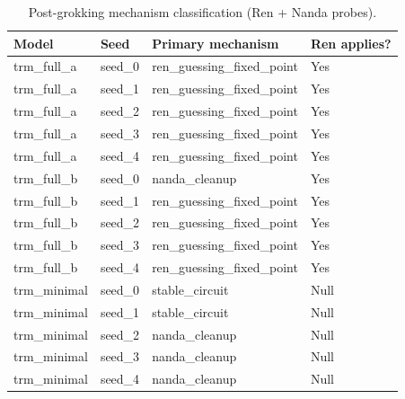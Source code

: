 \begin{table}[h]
  \centering
  \caption{Post-grokking mechanism classification (Ren + Nanda probes).}
  \label{tab:ren_mechanism}
  \begin{tabular}{llll}
    \toprule
    Model & Seed & Primary mechanism & Ren applies? \\
    \midrule
    trm\_full\_a & seed\_0 & ren\_guessing\_fixed\_point & Yes \\
    trm\_full\_a & seed\_1 & ren\_guessing\_fixed\_point & Yes \\
    trm\_full\_a & seed\_2 & ren\_guessing\_fixed\_point & Yes \\
    trm\_full\_a & seed\_3 & ren\_guessing\_fixed\_point & Yes \\
    trm\_full\_a & seed\_4 & ren\_guessing\_fixed\_point & Yes \\
    trm\_full\_b & seed\_0 & nanda\_cleanup & Yes \\
    trm\_full\_b & seed\_1 & ren\_guessing\_fixed\_point & Yes \\
    trm\_full\_b & seed\_2 & ren\_guessing\_fixed\_point & Yes \\
    trm\_full\_b & seed\_3 & ren\_guessing\_fixed\_point & Yes \\
    trm\_full\_b & seed\_4 & ren\_guessing\_fixed\_point & Yes \\
    trm\_minimal & seed\_0 & stable\_circuit & Null \\
    trm\_minimal & seed\_1 & stable\_circuit & Null \\
    trm\_minimal & seed\_2 & nanda\_cleanup & Null \\
    trm\_minimal & seed\_3 & nanda\_cleanup & Null \\
    trm\_minimal & seed\_4 & nanda\_cleanup & Null \\
    \bottomrule
  \end{tabular}
\end{table}
